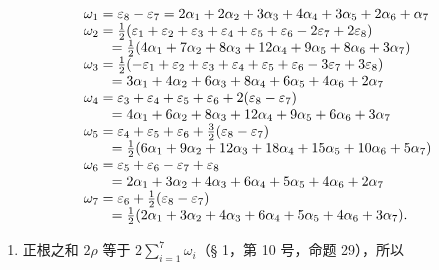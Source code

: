 \[
\begin{array}{r l} & {\omega_ {1} = \varepsilon_ {8} - \varepsilon_ {7} = 2 \alpha_ {1} + 2 \alpha_ {2} + 3 \alpha_ {3} + 4 \alpha_ {4} + 3 \alpha_ {5} + 2 \alpha_ {6} + \alpha_ {7}} \\ & {\omega_ {2} = \frac {1}{2} (\varepsilon_ {1} + \varepsilon_ {2} + \varepsilon_ {3} + \varepsilon_ {4} + \varepsilon_ {5} + \varepsilon_ {6} - 2 \varepsilon_ {7} + 2 \varepsilon_ {8})} \\ & {\qquad = \frac {1}{2} (4 \alpha_ {1} + 7 \alpha_ {2} + 8 \alpha_ {3} + 12 \alpha_ {4} + 9 \alpha_ {5} + 8 \alpha_ {6} + 3 \alpha_ {7})} \\ & {\omega_ {3} = \frac {1}{2} (- \varepsilon_ {1} + \varepsilon_ {2} + \varepsilon_ {3} + \varepsilon_ {4} + \varepsilon_ {5} + \varepsilon_ {6} - 3 \varepsilon_ {7} + 3 \varepsilon_ {8})} \\ & {\qquad = 3 \alpha_ {1} + 4 \alpha_ {2} + 6 \alpha_ {3} + 8 \alpha_ {4} + 6 \alpha_ {5} + 4 \alpha_ {6} + 2 \alpha_ {7}} \\ & {\omega_ {4} = \varepsilon_ {3} + \varepsilon_ {4} + \varepsilon_ {5} + \varepsilon_ {6} + 2 (\varepsilon_ {8} - \varepsilon_ {7})} \\ & {\qquad = 4 \alpha_ {1} + 6 \alpha_ {2} + 8 \alpha_ {3} + 12 \alpha_ {4} + 9 \alpha_ {5} + 6 \alpha_ {6} + 3 \alpha_ {7}} \\ & {\omega_ {5} = \varepsilon_ {4} + \varepsilon_ {5} + \varepsilon_ {6} + \frac {3}{2} (\varepsilon_ {8} - \varepsilon_ {7})} \\ & {\qquad = \frac {1}{2} (6 \alpha_ {1} + 9 \alpha_ {2} + 12 \alpha_ {3} + 18 \alpha_ {4} + 15 \alpha_ {5} + 10 \alpha_ {6} + 5 \alpha_ {7})} \\ & {\omega_ {6} = \varepsilon_ {5} + \varepsilon_ {6} - \varepsilon_ {7} + \varepsilon_ {8}} \\ & {\qquad = 2 \alpha_ {1} + 3 \alpha_ {2} + 4 \alpha_ {3} + 6 \alpha_ {4} + 5 \alpha_ {5} + 4 \alpha_ {6} + 2 \alpha_ {7}} \\ & {\omega_ {7} = \varepsilon_ {6} + \frac {1}{2} (\varepsilon_ {8} - \varepsilon_ {7})} \\ & {\qquad = \frac {1}{2} (2 \alpha_ {1} + 3 \alpha_ {2} + 4 \alpha_ {3} + 6 \alpha_ {4} + 5 \alpha_ {5} + 4 \alpha_ {6} + 3 \alpha_ {7}).} \end{array}
\]

\begin{enumerate}
\def\labelenumi{(\Roman{enumi})}
\setcounter{enumi}{6}
\tightlist
\item
  正根之和 \(2\rho\) 等于 \(2\sum_{i=1}^{7}\omega_i\)（§ 1，第 10 号，命题 29），所以
\end{enumerate}

